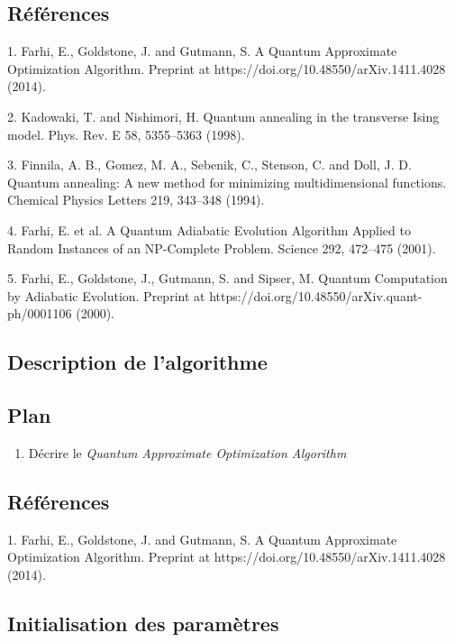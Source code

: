 \subsection*{Références}

1. Farhi, E., Goldstone, J. and Gutmann, S. A Quantum Approximate Optimization Algorithm. Preprint at https://doi.org/10.48550/arXiv.1411.4028 (2014).

2. Kadowaki, T. and Nishimori, H. Quantum annealing in the transverse Ising model. Phys. Rev. E 58, 5355–5363 (1998).

3. Finnila, A. B., Gomez, M. A., Sebenik, C., Stenson, C. and Doll, J. D. Quantum annealing: A new method for minimizing multidimensional functions. Chemical Physics Letters 219, 343–348 (1994).

4. Farhi, E. et al. A Quantum Adiabatic Evolution Algorithm Applied to Random Instances of an NP-Complete Problem. Science 292, 472–475 (2001).

5. Farhi, E., Goldstone, J., Gutmann, S. and Sipser, M. Quantum Computation by Adiabatic Evolution. Preprint at https://doi.org/10.48550/arXiv.quant-ph/0001106 (2000).


\subsection{Description de l'algorithme}

\subsection*{Plan}

\begin{enumerate}
    \item Décrire le \textit{Quantum Approximate Optimization Algorithm}
\end{enumerate}

\subsection*{Références}

1. Farhi, E., Goldstone, J. and Gutmann, S. A Quantum Approximate Optimization Algorithm. Preprint at https://doi.org/10.48550/arXiv.1411.4028 (2014).


\subsection{Initialisation des paramètres}

